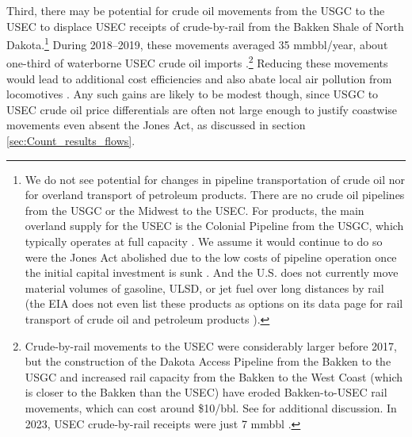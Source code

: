 \documentclass[12pt]{article}
\begin{document}
Third, there may be potential for crude oil movements from the USGC to the USEC to displace USEC receipts of crude-by-rail from the Bakken Shale of North Dakota.\footnote{We do not see potential for changes in pipeline transportation of crude oil nor for overland transport of petroleum products. There are no crude oil pipelines from the USGC or the Midwest to the USEC. For products, the main overland supply for the USEC is the Colonial Pipeline from the USGC, which typically operates at full capacity \citep{EIAcolonialflow}. We assume it would continue to do so were the Jones Act abolished due to the low costs of pipeline operation once the initial capital investment is sunk \citep{covertkellogg2023}. And the U.S. does not currently move material volumes of gasoline, ULSD, or jet fuel over long distances by rail (the EIA does not even list these products as options on its data page for rail transport of crude oil and petroleum products \citep{EIACBR}).} During 2018--2019, these movements averaged 35 mmbbl/year, about one-third of waterborne USEC crude oil imports \citep{EIACBR}.\footnote{Crude-by-rail movements to the USEC were considerably larger before 2017, but the construction of the Dakota Access Pipeline from the Bakken to the USGC and increased rail capacity from the Bakken to the West Coast (which is closer to the Bakken than the USEC) have eroded Bakken-to-USEC rail movements, which can cost around \$10/bbl. See \cite{covertkellogg2023} for additional discussion. In 2023, USEC crude-by-rail receipts were just 7 mmbbl \citep{EIACBR}.} Reducing these movements would lead to additional cost efficiencies and also abate local air pollution from locomotives \citep{clay2019,covertkellogg2023}. Any such gains are likely to be modest though, since USGC to USEC crude oil price differentials are often not large enough to justify coastwise movements even absent the Jones Act, as discussed in section \ref{sec:Count_results_flows}.
\end{document}
